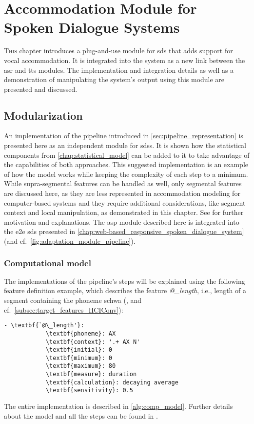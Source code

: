 \chapter[Accommodation Module for Spoken Dialogue Systems]{Accommodation Module for\\Spoken Dialogue Systems}
\label{chap:convergence_module_for_sdss}

\lettrine{T}{his} chapter introduces a plug-and-use module for \acs{sds} that adds support for vocal accommodation.
It is integrated into the system as a new link between the \acs{asr} and \acs{tts} modules.
The implementation and integration details as well as a demonstration of manipulating the system's output using this module are presented and discussed.

\pagebreak

\section{Modularization}
\label{sec:modularization}

An implementation of the pipeline introduced in \cref{sec:pipeline_representation} is presented here as an independent module for \acp{sds}.
It is shown how the statistical components from \cref{chap:statistical_model} can be added to it to take advantage of the capabilities of both approaches.
This suggested implementation is an example of how the model works while keeping the complexity of each step to a minimum.
While supra-segmental features can be handled as well, only segmental features are discussed here, as they are less represented in accommodation modeling for computer-based systems and they require additional considerations, like segment context and local manipulation, as demonstrated in this chapter.
See \citet{Raveh2017SemDial} for further motivation and explanations.
The \ac{asp} module described here is integrated into the \ac{e2e} \ac{sds} presented in \cref{chap:web-based_responsive_spoken_dialogue_system} (and cf.\ \cref{fig:adaptation_module_pipeline}).

\subsection{Computational model}
\label{subsec:computational_model}

The implementations of the pipeline's steps will be explained using the following feature definition example, which describes the feature \textit{@\_length}, i.e., length of a segment containing the phoneme schwa (\textipa{[@]}, and cf.\ \cref{subsec:target_features_HCIConv}):
%
\begin{Verbatim}[tabsize=4, commandchars=\\\{\}]
	- \textbf{`@\_length'}:
			\textbf{phoneme}: AX
			\textbf{context}: '.+ AX N'
			\textbf{initial}: 0
			\textbf{minimum}: 0 
			\textbf{maximum}: 80
			\textbf{measure}: duration
			\textbf{calculation}: decaying average
			\textbf{sensitivity}: 0.5
\end{Verbatim}
%
The entire implementation is described in \cref{alg:comp_model}.
Further details about the model and all the steps can be found in \citet{Raveh2017Interspeech}.

